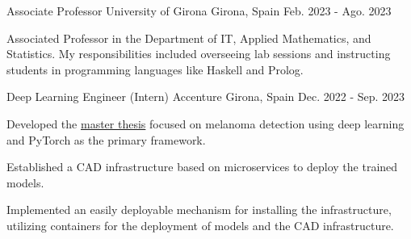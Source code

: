 

\begin{cventries}

  \cventry
  {Associate Professor} %
  {University of Girona} %
  {Girona, Spain} %
  {Feb. 2023 - Ago. 2023} %
  {
    \begin{cvitems} %
    \item {Associated Professor in the Department of IT,
      Applied Mathematics, and Statistics.
      My responsibilities included overseeing lab sessions and
      instructing students in programming languages like Haskell and Prolog.}
    \end{cvitems}
    }


    \cventry
    {Deep Learning Engineer (Intern)} %
    {Accenture} %
    {Girona, Spain} %
    {Dec. 2022 - Sep. 2023} %
    {
    \begin{cvitems}
    \item {Developed the \href{https://github.com/wilberquito/melanoma.thesis}{\color{awesome-red}master thesis}
        focused on melanoma detection using deep learning and PyTorch as the primary framework.}
      \item {Established a CAD infrastructure based on microservices to deploy the trained models.}
      \item {Implemented an easily deployable mechanism for
        installing the infrastructure, utilizing containers for the deployment
        of models and the CAD infrastructure.}
    \end{cvitems}
    }


\end{cventries}
